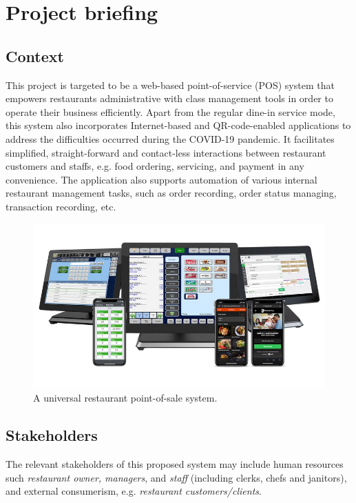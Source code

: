\documentclass[12pt, a4paper]{article}
\theoremstyle{styleth}
\theoremstyle{styledef}
\begin{document}
\section{Project briefing}
\subsection{Context}
This project is targeted to be a web-based point-of-service (POS) system that empowers restaurants administrative with class management tools in order to operate their business efficiently. Apart from the regular dine-in service mode, this system also incorporates Internet-based and QR-code-enabled applications to address the difficulties occurred during the COVID-19 pandemic. It facilitates simplified, straight-forward and contact-less interactions between restaurant customers and staffs, e.g. food ordering, servicing, and payment in any convenience. The application also supports automation of various internal restaurant management tasks, such as order recording, order status managing, transaction recording, etc.

\begin{figure}[H]
	\centering
	\includegraphics[width=16cm]{61017fc978f5606b7f0ee2de_aloha-essentials-and-silver-no-orderpay-p-800.png}
	\caption{A universal restaurant point-of-sale system.}
	\label{fig:adafruitdashboard}
\end{figure}

\subsection{Stakeholders}

The relevant stakeholders of this proposed system may include human resources such \textit{restaurant owner, managers}, and \textit{staff} (including clerks, chefs and janitors), and external consumerism, e.g. \textit{restaurant customers/clients}.
\end{document}
